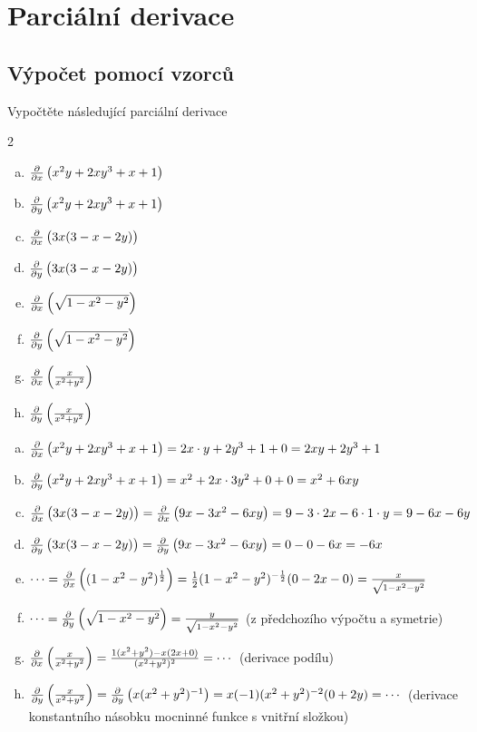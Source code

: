 \section{Parciální derivace}

\subsection{Výpočet pomocí vzorců}

Vypočtěte následující parciální derivace

\newcommand\pd[2][x]{\frac{\partial }{\partial #1}\left(\vphantom {\frac 22}#2\right)}
\begin{multicols}2
\begin{enumerate}[a)]
\item $\pd{x^2y+2xy^3+x+1}$
\item $\pd[y]{x^2y+2xy^3+x+1}$
\item $\pd{3x(3-x-2y)}$
\item $\pd[y]{3x(3-x-2y)}$
\item $\pd[x]{\sqrt{1-x^2-y^2}}$
\item $\pd[y]{\sqrt{1-x^2-y^2}}$
\item $\pd[x]{\frac x{x^2+y^2}}$
\item $\pd[y]{\frac x{x^2+y^2}}$
\end{enumerate}
\end{multicols}

\reseni
\begin{enumerate}[a)]
\item $\pd{x^2y+2xy^3+x+1}=2x\cdot y+2y^3+1+0=2xy+2y^3+1$
\item $\pd[y]{x^2y+2xy^3+x+1}=x^2+2x\cdot 3y^2+0+0=x^2+6xy$
\item $\pd{3x(3-x-2y)}=\pd{9x-3x^2-6xy}=9-3\cdot 2x-6\cdot 1\cdot y=9-6x-6y$
\item $\pd[y]{3x(3-x-2y)}=\pd[y]{9x-3x^2-6xy}=0-0-6x=-6x$
\item $\cdots=\pd[x]{(1-x^2-y^2)^{\frac 12}}=\frac 12 (1-x^2-y^2)^{-\frac 12} (0-2x-0)=
  \frac {x}{\sqrt{1-x^2-y^2}}$
\item $\cdots=\pd[y]{\sqrt{1-x^2-y^2}}= \frac {y}{\sqrt{1-x^2-y^2}}$ (z předchozího výpočtu a symetrie)
  
\item $\pd[x]{\frac x{x^2+y^2}}=\frac{1(x^2+y^2)-x(2x+0)}{(x^2+y^2)^2}=\cdots$ (derivace podílu)
\item $\pd[y]{\frac x{x^2+y^2}}=\pd[y]{x(x^2+y^2)^{-1}}=x(-1)(x^2+y^2)^{-2}(0+2y)=\cdots$ (derivace konstantního násobku mocninné funkce s vnitřní složkou)

\end{enumerate}


